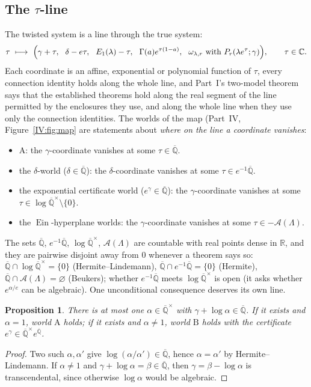 \documentclass[11pt,a4paper]{article}
\newcommand{\R}{\mathbb R}
\newcommand{\C}{\mathbb C}
\newcommand{\Qbar}{\overline{\mathbb Q}}
\newcommand{\Ein}{\operatorname{Ein}}
\newcommand{\Aff}{\mathcal A}
\newtheorem{proposition}[theorem]{Proposition}
\theoremstyle{definition}
\theoremstyle{remark}
\numberwithin{equation}{section}
\begin{document}
\subsection{The $\tau$-line}

The twisted system is a line through the true system:
\[
 \tau\ \longmapsto\ \Bigl(\gamma+\tau,\ \ \delta-e\tau,\ \ E_1(\lambda)-\tau,\ \ \Gamma(a)e^{\tau(1-a)},\ \
 \omega_{\lambda,r}\text{ with }P_r(\lambda e^{\tau};\gamma)\Bigr),\qquad\tau\in\C .
\]
Each coordinate is an affine, exponential or polynomial function of $\tau$, every
connection identity holds along the whole line, and Part~I's two-model theorem says that
the established theorems hold along the real segment of the line permitted by the
enclosures they use, and along the whole line when they use only the connection
identities. The worlds of the map (Part~IV, Figure~\ref{IV:fig:map} are
statements about \emph{where on the line a coordinate vanishes}:
\begin{itemize}[leftmargin=*]
\item $\mathrm A$: the $\gamma$-coordinate vanishes at some $\tau\in\Qbar$.
\item the $\delta$-world ($\delta\in\Qbar$): the $\delta$-coordinate vanishes at some
$\tau\in e^{-1}\Qbar$.
\item the exponential certificate world ($e^\gamma\in\Qbar$): the $\gamma$-coordinate
vanishes at some $\tau\in\log\Qbar^\times\setminus\{0\}$.
\item the $\Ein$-hyperplane worlds: the $\gamma$-coordinate vanishes at some
$\tau\in-\Aff(\Lambda)$.
\end{itemize}
The sets $\Qbar$, $e^{-1}\Qbar$, $\log\Qbar^\times$, $\Aff(\Lambda)$ are countable with real
points dense in $\R$, and they are pairwise disjoint away from $0$ whenever a theorem says
so:
$\Qbar\cap\log\Qbar^\times=\{0\}$ (Hermite--Lindemann), $\Qbar\cap e^{-1}\Qbar=\{0\}$
(Hermite), $\Qbar\cap\Aff(\Lambda)=\varnothing$ (Beukers); whether
$e^{-1}\Qbar$ meets $\log\Qbar^\times$ is open (it asks whether $e^{\alpha/e}$ can be
algebraic). One unconditional consequence deserves its own line.

\begin{proposition}\label{V:prop:oneshift}
There is at most one $\alpha\in\Qbar^\times$ with $\gamma+\log\alpha\in\Qbar$. If it exists
and $\alpha=1$, world $\mathrm A$ holds; if it exists and $\alpha\ne1$, world $\mathrm B$
holds with the certificate $e^{\gamma}\in\Qbar^\times e^{\Qbar}$.
\end{proposition}
\begin{proof}
Two such $\alpha,\alpha'$ give $\log(\alpha/\alpha')\in\Qbar$, hence $\alpha=\alpha'$ by
Hermite--Lindemann. If $\alpha\ne1$ and $\gamma+\log\alpha=\beta\in\Qbar$, then
$\gamma=\beta-\log\alpha$ is transcendental, since otherwise $\log\alpha$ would be algebraic.
\end{proof}
\end{document}
